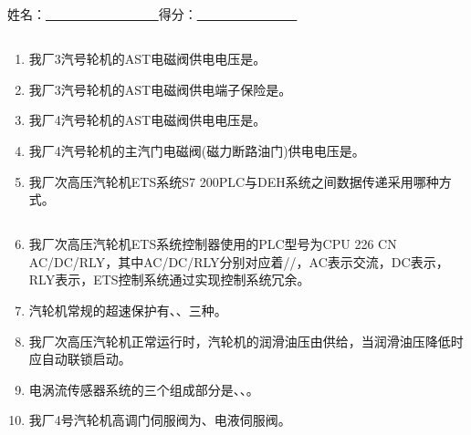 \documentclass{book}
\begin{document}
		\else						%
		\fi						%
\chapter[2024年03月份技术培训考试]{	\hspace*{-0.3em}}
姓名：\uline{ \ \  \  \ \ \ \ \ \ \ \ \ \ \ \ \ \ }\hfill 得分：\uline{ \ \  \  \ \ \ \ \ \  \ \ \ \ \ \ }
\section{}
\begin{enumerate}
\item 我厂3汽号轮机的AST电磁阀供电电压是。
\item 我厂3汽号轮机的AST电磁阀供电端子保险是。
\item 我厂4汽号轮机的AST电磁阀供电电压是。
\item 我厂4汽号轮机的主汽门电磁阀(磁力断路油门)供电电压是。
\item 我厂次高压汽轮机ETS系统S7 200PLC与DEH系统之间数据传递采用哪种方式。
\end{enumerate}
\section{}
\begin{enumerate}
	\setcounter{enumi}{5}
	\item 我厂次高压汽轮机ETS系统控制器使用的PLC型号为CPU 226 CN AC/DC/RLY，其中AC/DC/RLY分别对应着//，AC表示交流，DC表示，RLY表示，ETS控制系统通过实现控制系统冗余。
\item 汽轮机常规的超速保护有、、三种。
\item 我厂次高压汽轮机正常运行时，汽轮机的润滑油压由供给，当润滑油压降低时应自动联锁启动。
\item 电涡流传感器系统的三个组成部分是、、。
\item 我厂4号汽轮机高调门伺服阀为、电液伺服阀。
\end{enumerate}
\end{document}
